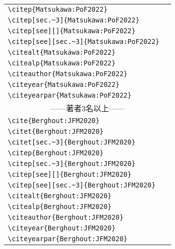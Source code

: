 \begin{table}[t]
\begin{tabular}{ll}
        \verb|\citep{Matsukawa:PoF2022}|        &\citep{Matsukawa:PoF2022} \\
        \verb|\citep[sec.~3]{Matsukawa:PoF2022}|        &\citep[sec.~3]{Matsukawa:PoF2022} \\
        \verb|\citep[see][]{Matsukawa:PoF2022}|        &\citep[see][]{Matsukawa:PoF2022} \\
        \verb|\citep[see][sec.~3]{Matsukawa:PoF2022}|        &\citep[see][sec.~3]{Matsukawa:PoF2022} \\
        \verb|\citealt{Matsukawa:PoF2022}|      &\citealt{Matsukawa:PoF2022} \\
        \verb|\citealp{Matsukawa:PoF2022}|      &\citealp{Matsukawa:PoF2022} \\
        \verb|\citeauthor{Matsukawa:PoF2022}|   &\citeauthor{Matsukawa:PoF2022} \\
        \verb|\citeyear{Matsukawa:PoF2022}|     &\citeyear{Matsukawa:PoF2022} \\
        \verb|\citeyearpar{Matsukawa:PoF2022}|  &\citeyearpar{Matsukawa:PoF2022} \\
        \multicolumn{2}{c}{------著者3名以上------} \\
        \verb|\cite{Berghout:JFM2020}|          &\cite{Berghout:JFM2020} \\
        \verb|\citet{Berghout:JFM2020}|         &\citet{Berghout:JFM2020} \\
        \verb|\citet[sec.~3]{Berghout:JFM2020}|         &\citet[sec.~3]{Berghout:JFM2020} \\
        \verb|\citep{Berghout:JFM2020}|         &\citep{Berghout:JFM2020} \\
        \verb|\citep[sec.~3]{Berghout:JFM2020}|         &\citep[sec.~3]{Berghout:JFM2020} \\
        \verb|\citep[see][]{Berghout:JFM2020}|         &\citep[see][]{Berghout:JFM2020} \\
        \verb|\citep[see][sec.~3]{Berghout:JFM2020}|         &\citep[see][sec.~3]{Berghout:JFM2020} \\
        \verb|\citealt{Berghout:JFM2020}|       &\citealt{Berghout:JFM2020} \\
        \verb|\citealp{Berghout:JFM2020}|       &\citealp{Berghout:JFM2020} \\
        \verb|\citeauthor{Berghout:JFM2020}|    &\citeauthor{Berghout:JFM2020} \\
        \verb|\citeyear{Berghout:JFM2020}|      &\citeyear{Berghout:JFM2020} \\
        \verb|\citeyearpar{Berghout:JFM2020}|   &\citeyearpar{Berghout:JFM2020}
    \end{tabular}
\end{table}


